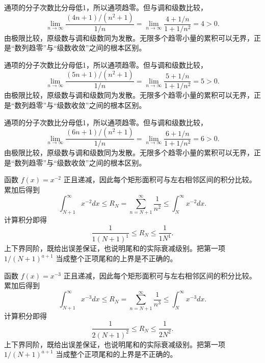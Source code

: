\documentclass[12pt,fontset=fandol]{ctexart}
\begin{document}
\begin{solve}\label{ans:c25q16}
通项的分子次数比分母低1，所以通项趋零。但与调和级数比较，
\[
\lim_{n\to\infty}\frac{(4n+1)/(n^2+1)}{1/n}=\lim_{n\to\infty}\frac{4+1/n}{1+1/n^2}=4>0.
\]
由极限比较，原级数与调和级数同为发散。无限多个趋零小量的累积可以无界，正是“数列趋零”与“级数收敛”之间的根本区别。
\end{solve}

\begin{solve}\label{ans:c25q17}
通项的分子次数比分母低1，所以通项趋零。但与调和级数比较，
\[
\lim_{n\to\infty}\frac{(5n+1)/(n^2+1)}{1/n}=\lim_{n\to\infty}\frac{5+1/n}{1+1/n^2}=5>0.
\]
由极限比较，原级数与调和级数同为发散。无限多个趋零小量的累积可以无界，正是“数列趋零”与“级数收敛”之间的根本区别。
\end{solve}

\begin{solve}\label{ans:c25q18}
通项的分子次数比分母低1，所以通项趋零。但与调和级数比较，
\[
\lim_{n\to\infty}\frac{(6n+1)/(n^2+1)}{1/n}=\lim_{n\to\infty}\frac{6+1/n}{1+1/n^2}=6>0.
\]
由极限比较，原级数与调和级数同为发散。无限多个趋零小量的累积可以无界，正是“数列趋零”与“级数收敛”之间的根本区别。
\end{solve}

\begin{solve}\label{ans:c25q19}
函数 $f(x)=x^{-2}$ 正且递减，因此每个矩形面积可与左右相邻区间的积分比较。累加后得到
\[
\int_{N+1}^\infty x^{-2}dx\le R_N=\sum_{n=N+1}^\infty\frac1{n^{2}}\le\int_N^\infty x^{-2}dx.
\]
计算积分即得
\[
\frac1{1(N+1)^{1}}\le R_N\le\frac1{1N^{1}}.
\]
上下界同阶，既给出误差保证，也说明尾和的实际衰减级别。把第一项 $1/(N+1)^{a+1}$ 当成整个正项尾和的上界是不正确的。
\end{solve}

\begin{solve}\label{ans:c25q20}
函数 $f(x)=x^{-3}$ 正且递减，因此每个矩形面积可与左右相邻区间的积分比较。累加后得到
\[
\int_{N+1}^\infty x^{-3}dx\le R_N=\sum_{n=N+1}^\infty\frac1{n^{3}}\le\int_N^\infty x^{-3}dx.
\]
计算积分即得
\[
\frac1{2(N+1)^{2}}\le R_N\le\frac1{2N^{2}}.
\]
上下界同阶，既给出误差保证，也说明尾和的实际衰减级别。把第一项 $1/(N+1)^{a+1}$ 当成整个正项尾和的上界是不正确的。
\end{solve}
\end{document}

